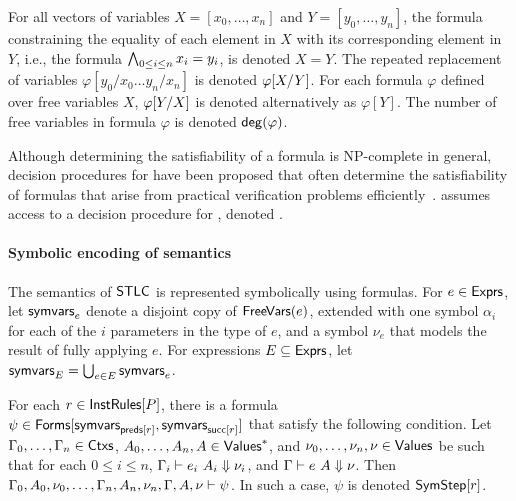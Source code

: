 For all vectors of variables $X = [ x_0, \ldots, x_n ]$ and $Y = [
y_0, \ldots, y_n ]$, the \lia formula constraining the equality of
each element in $X$ with its corresponding element in $Y$, i.e., the
formula $\bigland_{0 \leq i \leq n} x_i = y_i$, is denoted $X = Y$.
%
The repeated replacement of variables $\varphi[ y_0 / x_0 \ldots y_{n}
/ x_{n} ]$ is denoted $\replace{\varphi}{Y}{X}$.
%
For each formula $\varphi$ defined over free variables $X$,
$\replace{\varphi}{X}{Y}$ is denoted alternatively as $\varphi[Y]$.
%
The number of free variables in formula $\varphi$ is denoted
$\degreeof(\varphi)$.

Although determining the satisfiability of a \lia formula is
NP-complete in general, decision procedures for \lia have been
proposed that often determine the satisfiability of formulas that
arise from practical verification problems
efficiently~\cite{demoura08}.
%
\sys assumes access to a decision procedure for \lia, denoted \issat.

\paragraph{Symbolic encoding of semantics}
%
The semantics of $\stlc$ is represented symbolically using \lia
formulas.
%
For $e \in \expr$, let $\symvars{e}$ denote a disjoint copy of
$\freevars(e)$, extended with one symbol $\alpha_i$ for each of the
$i$ parameters in the type of $e$, and a symbol $\nu_e$ that
models the result of fully applying $e$. 
%
For expressions $E \subseteq \expr$, let $\symvars{E} = \bigunion_{e
  \in E} \symvars{e}$.

For each $r \in \instrules{ P }$, there is a formula $\psi \in
\formulas{ \symvars{ \rulepreds{r} }, \symvars{ \rulesucc{r} } }$ that
satisfy the following condition.
%
Let $\Gamma_0, \ldots, \Gamma_n \in \ctxs$, $A_0, \ldots, A_n, A \in
\values^{*}$, and $\nu_0, \ldots, \nu_n, \nu \in \values$ be such that
for each $0 \leq i \leq n$, $\Gamma_i \judges e_i\ A_i \evalsto
\nu_i$, and $\Gamma \judges e\ A \evalsto \nu$.
%
Then $\Gamma_0, A_0, \nu_0, \ldots, \Gamma_n, A_n, \nu_n, \Gamma, A,
\nu \sats \psi$.
%
In such a case, $\psi$ is denoted $\symstep{ r }$.

